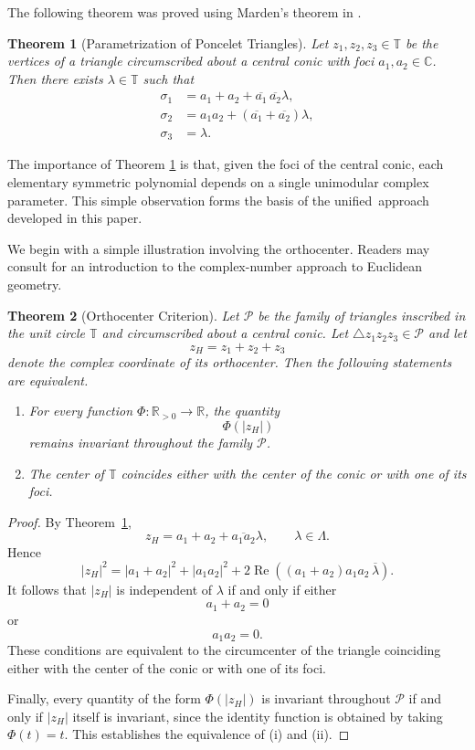 \documentclass[11pt,reqno]{amsart}
\newtheorem{theorem}{Theorem}[section]
\theoremstyle{definition}
\numberwithin{equation}{section}
\begin{document}
The following theorem was proved using Marden's theorem in \cite{Murad2026b}.

\begin{theorem}[Parametrization of Poncelet Triangles]
\label{thm:sympara}
Let $z_1,z_2,z_3\in\mathbb T$ be the vertices of a triangle circumscribed about a central conic with foci $a_1, a_2 \in\mathbb C$. Then there exists $\lambda\in\mathbb T$ such that
\begin{align}
\sigma_1
&=
a_1+a_2+\overline{a_1}\,\overline{a_2}\lambda,
\label{eq:sigma1}
\\
\sigma_2
&=
a_1a_2+
(\overline{a_1}+\overline{a_2})\lambda,
\label{eq:sigma2}
\\
\sigma_3
&=
\lambda.
\label{eq:sigma3}
\end{align}
\end{theorem}

The importance of Theorem \ref{thm:sympara} is that, given the foci of the central conic, each elementary symmetric polynomial depends on a single unimodular complex parameter. This simple observation forms the basis of the unified \,approach developed in this paper.

We begin with a simple illustration involving the orthocenter. Readers may consult \cite{Hahn2019} for an introduction to the complex-number approach to Euclidean geometry. 


\begin{theorem}[Orthocenter Criterion]
\label{thm:orthocentercriterion}
Let $\mathcal P$ be the family of triangles inscribed in the unit circle $\mathbb T$ and circumscribed about a central conic. Let $\triangle z_1z_2z_3\in\mathcal P$ and let
\[
z_H=z_1+z_2+z_3
\]
denote the complex coordinate of its orthocenter. Then the following statements are equivalent.
\begin{enumerate}
\item[(i)]
For every function $\Phi:\mathbb R_{>0}\to\mathbb R$, the quantity
\[
\Phi(|z_H|)
\]
remains invariant throughout the family $\mathcal P$.
\item[(ii)]
The center of $\mathbb T$ coincides either with the center of the conic or with one of its foci.
\end{enumerate}
\end{theorem}

\begin{proof}
By Theorem~\ref{thm:sympara},
\begin{equation}\label{eq:zHrelation}
z_H
=
a_1+a_2+\overline{a_1a_2}\lambda,
\qquad
\lambda\in\Lambda.
\end{equation}
Hence
\[
|z_H|^2
=
|a_1+a_2|^2
+
|a_1a_2|^2
+
2\operatorname{Re}\left((a_1+a_2)a_1a_2\,\overline{\lambda}\right).
\]
It follows that $|z_H|$ is independent of $\lambda$ if and only if either
\[
a_1+a_2=0
\]
or
\[
a_1a_2=0.
\]
These conditions are equivalent to the circumcenter of the triangle coinciding either with the center of the conic or with one of its foci.

Finally, every quantity of the form $\Phi(|z_H|)$ is invariant throughout $\mathcal P$ if and only if $|z_H|$ itself is invariant, since the identity function is obtained by taking $\Phi(t)=t$. This establishes the equivalence of (i) and (ii).
\end{proof}
\end{document}
